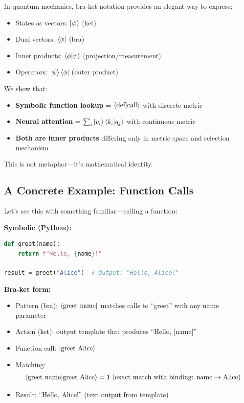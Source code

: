 \documentclass[11pt,a4paper]{article}
\theoremstyle{definition}
\begin{document}
In quantum mechanics, bra-ket notation provides an elegant way to express:
\begin{itemize}
\item States as vectors: $\ket{\psi}$ (ket)
\item Dual vectors: $\bra{\phi}$ (bra)
\item Inner products: $\braket{\phi|\psi}$ (projection/measurement)
\item Operators: $\ket{\psi}\bra{\phi}$ (outer product)
\end{itemize}

We show that:
\begin{itemize}
\item \textbf{Symbolic function lookup} = $\braket{\text{def}|\text{call}}$ with discrete metric
\item \textbf{Neural attention} = $\sum_i \ket{v_i} \braket{k_i|q_j}$ with continuous metric
\item \textbf{Both are inner products} differing only in metric space and selection mechanism
\end{itemize}

This is not metaphor---it's mathematical identity.

\subsection{A Concrete Example: Function Calls}

Let's see this with something familiar---calling a function:

\textbf{Symbolic (Python):}
\begin{lstlisting}[language=Python]
def greet(name):
    return f"Hello, {name}!"

result = greet("Alice")  # Output: "Hello, Alice!"
\end{lstlisting}

\textbf{Bra-ket form:}
\begin{itemize}
\item Pattern (bra): $\bra{\text{greet name}}$ matches calls to ``greet'' with any name parameter
\item Action (ket): output template that produces ``Hello, [name]''
\item Function call: $\ket{\text{greet Alice}}$
\item Matching: 
\begin{equation}
\braket{\text{greet name}|\text{greet Alice}} = 1 \text{ (exact match with binding: name} \mapsto \text{Alice)}
\end{equation}
\item Result: ``Hello, Alice!'' (text output from template)
\end{itemize}
\end{document}
